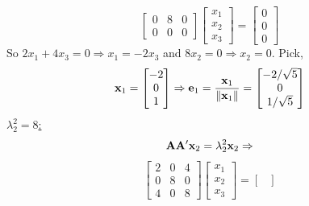 \begin{enumerate}[font=\bfseries]
\begin{enumerate}
\[\begin{bmatrix}
                    0 & 8 & 0 \\
                    0 & 0 & 0
                \end{bmatrix}
                \begin{bmatrix}
                    x_1 \\
                    x_2 \\
                    x_3
                \end{bmatrix}
                =
                \begin{bmatrix}
                    0 \\
                    0 \\
                    0
                \end{bmatrix}
            \]
            So $2x_1 + 4x_3 = 0 \Rightarrow x_1 = -2x_3$ and $8x_2 = 0 \Rightarrow x_2 = 0$. Pick,
            \[
                \bold{x}_1
                =
                \begin{bmatrix}
                    -2 \\
                    0 \\
                    1
                \end{bmatrix}
                \Rightarrow
                \bold{e}_1
                =
                \frac{\bold{x}_1}{\left\|\bold{x}_1\right\|}
                =
                \begin{bmatrix}
                    -2/\sqrt{5} \\
                    0 \\
                    1/\sqrt{5}
                \end{bmatrix}
            \]
            \underline{$\lambda_2^2 = 8$:}
            \[
                \bold{A}\bold{A}^\prime\bold{x}_2=\lambda_2^2\bold{x}_2
                \Rightarrow
            \]
            \[
                \begin{bmatrix}
                    2 & 0 & 4 \\
                    0 & 8 & 0 \\
                    4 & 0 & 8
                \end{bmatrix}
                \begin{bmatrix}
                    x_1 \\
                    x_2 \\
                    x_3
                \end{bmatrix}
                =
                \begin{bmatrix}

\end{bmatrix}\]
\end{enumerate}
\end{enumerate}
